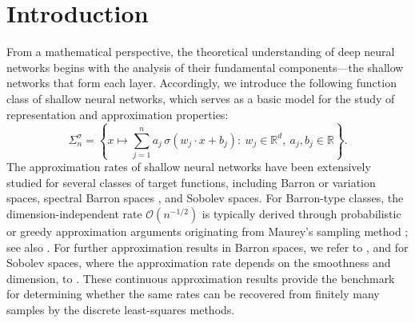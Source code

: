 \documentclass{article}
\numberwithin{equation}{section}
\begin{document}
\section{Introduction}



From a mathematical perspective, the theoretical understanding of deep neural networks begins with the analysis of their fundamental components---the shallow networks that form each layer. 
Accordingly, we introduce the following function class of shallow neural networks, which serves as a basic model for the study of representation and approximation properties:
\begin{equation}\label{shallow}
    \Sigma_{n}^\sigma = \left\{
        x\mapsto\sum_{j=1}^n a_j\, \sigma(w_j \cdot x + b_j) :~ w_j \in \mathbb{R}^{d},~ a_j, b_j \in \mathbb{R}
    \right\}.
\end{equation}
The approximation rates of shallow neural networks have been extensively studied for several classes of target functions, including Barron or variation spaces, spectral Barron spaces \cite{klusowski2018approximation,siegel2022high}, and Sobolev spaces. For Barron-type classes, the dimension-independent rate $\mathcal O(n^{-1/2})$ is typically derived through probabilistic or greedy approximation arguments originating from Maurey's sampling method \cite{maurey1973type,pisier1981remarques}; see also \cite{Jones1992,barron1993universal,barron1994approximation,devore1996some,makovoz1998uniform,kurkova1,kurkova2,lewicki2004approximation,temlyakov2008greedy,Barron2008,E2019population,E2019barron,E2020representation}. For further approximation results in Barron spaces, we refer to \cite{makovoz1996random,bach2017breaking,klusowski2018approximation,xu2020finite,siegel2022sharp,siegel2022optimal,mhaskar2023tractability}, and for Sobolev spaces, where the approximation rate depends on the smoothness and dimension, to \cite{mhaskar1993approximation,petrushev1998approximation,pinkus1999approximation}. These continuous approximation results provide the benchmark for determining whether the same rates can be recovered from finitely many samples by the discrete least-squares methods.
\end{document}

